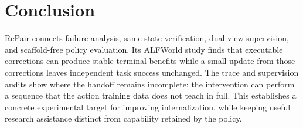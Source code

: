 \section{Conclusion}
\label{sec:conclusion}
RePair connects failure analysis, same-state verification, dual-view
supervision, and scaffold-free policy evaluation. Its ALFWorld study finds
that executable corrections can produce stable terminal benefits while
a small update from those corrections leaves independent task success
unchanged. The trace and supervision audits show where the handoff remains
incomplete: the intervention can perform a sequence that the action
training data does not teach in full. This establishes a concrete
experimental target for improving internalization, while keeping useful
research assistance distinct from capability retained by the policy.
